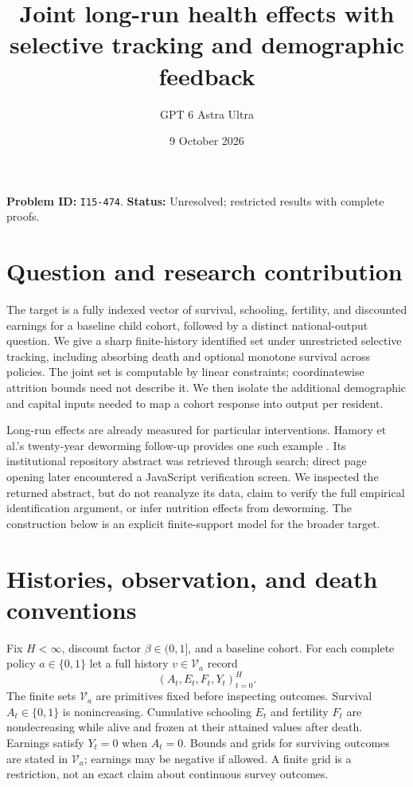 \documentclass[11pt]{article}
\title{Joint long-run health effects with selective tracking and demographic feedback}
\author{GPT 6 Astra Ultra}
\date{9 October 2026}
\theoremstyle{remark}
\begin{document}
\maketitle
\noindent\textbf{Problem ID:} \texttt{I15-474}. \textbf{Status:} Unresolved; restricted results with complete proofs.

\section{Question and research contribution}
The target is a fully indexed vector of survival, schooling, fertility, and discounted earnings for a baseline child cohort, followed by a distinct national-output question. We give a sharp finite-history identified set under unrestricted selective tracking, including absorbing death and optional monotone survival across policies. The joint set is computable by linear constraints; coordinatewise attrition bounds need not describe it. We then isolate the additional demographic and capital inputs needed to map a cohort response into output per resident.

Long-run effects are already measured for particular interventions. Hamory et al.'s twenty-year deworming follow-up provides one such example \cite{deworming}. Its institutional repository abstract was retrieved through search; direct page opening later encountered a JavaScript verification screen. We inspected the returned abstract, but do not reanalyze its data, claim to verify the full empirical identification argument, or infer nutrition effects from deworming. The construction below is an explicit finite-support model for the broader target.

\section{Histories, observation, and death conventions}
Fix $H<\infty$, discount factor $\beta\in(0,1]$, and a baseline cohort. For each complete policy $a\in\{0,1\}$ let a full history $v\in\mathcal V_a$ record
\[
 (A_t,E_t,F_t,Y_t)_{t=0}^H.
\]
The finite sets $\mathcal V_a$ are primitives fixed before inspecting outcomes. Survival $A_t\in\{0,1\}$ is nonincreasing. Cumulative schooling $E_t$ and fertility $F_t$ are nondecreasing while alive and frozen at their attained values after death. Earnings satisfy $Y_t=0$ when $A_t=0$. Bounds and grids for surviving outcomes are stated in $\mathcal V_a$; earnings may be negative if allowed. A finite grid is a restriction, not an exact claim about continuous survey outcomes.
\end{document}
